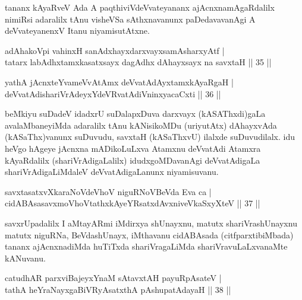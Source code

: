 \begin{artha}%
tananx kAyaRveV Ada A paqthiviVdeVvateyananx ajAcnxnamAgaRdalilx nimiRsi adaralilx tAnu visheVSa sAthxnavanunx paDedavavanAgi A deVvateyanenxV Itanu niyamisutAtxne.
\end{artha}

\begin{shl}
adAhakoV\s pi vahinxH sanAdxhayxdarxvayxsamAsharxyAtf |\\
tatarx labAdhxtamxkasatxsayx dagAdhx dAhayxsayx na savxtaH \hfill || 35 ||
\end{shl}

\begin{shl}
yathA jAcnxteYvameVvA\s \s tAmx deVvatAdAyxtamxkAyaRgaH |\\
deVvatAdishariVrAdeyxYdeVRvatAdiVninxyacaCxti \hfill || 36 ||
\end{shl}

\begin{artha}
beMkiyu suDadeV idadxrU suDalapxDuva darxvayx (kASAThxdi)gaLa avalaMbaneyiMda adaralilx tAnu kANisikoMDu (uriyutAtx) dAhayxvAda (kASaThx)vanunx suDuvudu, savxtaH (kASaThxvU) ilalxde suDuvudilalx. idu heVgo hAgeye jAcnxna mADikoLuLxva Atamxnu deVvatAdi Atamxra kAyaRdalilx (shariVrAdigaLalilx) idudxgoMDavanAgi deVvatAdigaLa shariVrAdigaLiMdaleV deVvatAdigaLanunx niyamisuvanu.
\end{artha}


\begin{shl}
savxtasatxvXkaraNoV\s deVhoV niguRNoV\s BeVda Eva ca |\\
cidABAsasavxmoVhoVtathxkAyeYRsatxdAvxniveVkaSxyXteV \hfill || 37 ||
\end{shl}

\begin{artha}
savxrUpadalilx I aMtayARmi iMdirxya shUnayxnu, matutx shariVrashUnayxnu matutx niguRNa, BeVdashUnayx, iMthavanu cidABAsada  (citfparxtibiMbada) tananx ajAcnxnadiMda huTiTxda shariVragaLiMda shariVravuLaLxvanaMte kANuvanu.
\end{artha}


\begin{shl}
catudhAR parxviBajeyxYnaM sAtavxtAH payuRpAsateV |\\
tathA heYraNayxgaBiVRyAsatxthA pAshupatAdayaH \hfill || 38 ||
\end{shl}

